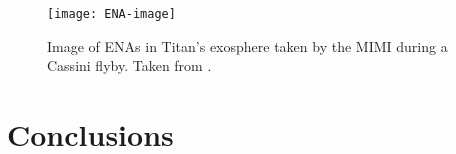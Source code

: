 \documentclass[12pt, parskip=full*, abstract]{scrartcl}
\begin{document}
\begin{figure}[htbp]
	\centering
	\texttt{[image: ENA-image]}
	\caption{Image of ENAs in Titan's exosphere taken by the MIMI during a Cassini flyby. Taken from \textcite{titan-exosphere-interaction}.}
	\label{ENA-image}
\end{figure}




 

\section{Conclusions}

\newpage
\printbibliography
\end{document}
